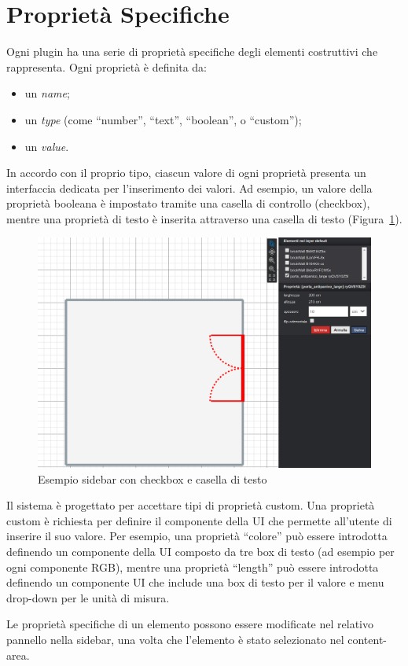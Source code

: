 \section{Propriet\`a Specifiche}
\label{sec:chapter_3_section_3}

\noindent

Ogni plugin ha una serie di proprietà specifiche degli elementi costruttivi che rappresenta.
Ogni propriet\`a \`e definita da:
\begin{itemize}
  \item un \emph{name};
  \item un \emph{type} (come ``number'', ``text'', ``boolean'', o ``custom'');
  \item un \emph{value}.
\end{itemize}
In accordo con il proprio tipo, ciascun valore di ogni proprietà presenta un interfaccia dedicata per l'inserimento dei valori.
Ad esempio, un valore della proprietà booleana è impostato tramite una casella di controllo (checkbox),
mentre una proprietà di testo è inserita attraverso una casella di testo (Figura~\ref{fig:dettaglio}).

\begin{figure}[htbp] %
   \centering
   \includegraphics[width=1\linewidth]{images/dettaglio}
   \caption{Esempio sidebar con checkbox e casella di testo}
   \label{fig:dettaglio}
   \end{figure}
\newpage

Il sistema \`e progettato per accettare tipi di propriet\`a custom. Una propriet\`a custom è richiesta per definire
il componente della UI che permette all'utente di inserire il suo valore.
Per esempio, una propriet\`a ``colore'' pu\`o essere introdotta definendo un componente della UI composto da tre box di testo
(ad esempio per ogni componente RGB), mentre una propriet\`a ``length'' pu\`o essere introdotta definendo un componente UI
che include una box di testo per il valore e menu drop-down per le unità di misura.

Le propriet\`a specifiche di un elemento possono essere modificate nel relativo pannello nella sidebar, una volta che l'elemento
\`e stato selezionato nel content-area.
\newpage
